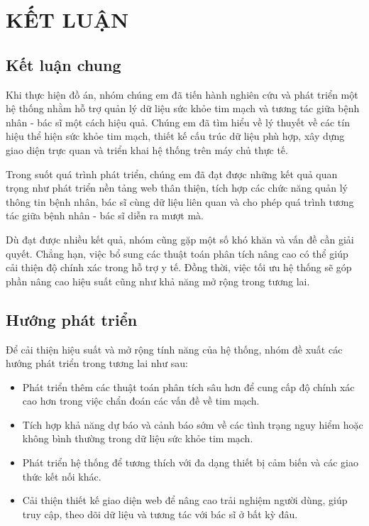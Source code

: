 
\section*{KẾT LUẬN}
\subsection*{Kết luận chung}

Khi thực hiện đồ án, nhóm chúng em đã tiến hành nghiên cứu và phát triển một hệ thống nhằm hỗ trợ quản lý dữ liệu sức khỏe tim mạch và tương tác giữa bệnh nhân - bác sĩ một cách hiệu quả.
Chúng em đã tìm hiểu về lý thuyết về các tín hiệu thể hiện sức khỏe tim mạch, thiết kế cấu trúc dữ liệu phù hợp, xây dựng giao diện trực quan và triển khai hệ thống trên máy chủ thực tế.  

Trong suốt quá trình phát triển, chúng em đã đạt được những kết quả quan trọng như phát triển nền tảng web thân thiện, tích hợp các chức năng quản lý thông tin bệnh nhân, bác sĩ cùng dữ liệu liên quan và cho phép quá trình tương tác giữa bệnh nhân - bác sĩ diễn ra mượt mà.

Dù đạt được nhiều kết quả, nhóm cũng gặp một số khó khăn và vấn đề cần giải quyết. Chẳng hạn, việc bổ sung các thuật toán phân tích nâng cao có thể giúp cải thiện độ chính xác trong hỗ trợ y tế. Đồng thời, việc tối ưu hệ thống sẽ góp phần nâng cao hiệu suất cũng như khả năng mở rộng trong tương lai.
\subsection*{Hướng phát triển}


Để cải thiện hiệu suất và mở rộng tính năng của hệ thống, nhóm đề xuất các hướng phát triển trong tương lai như sau:

\begin{adjustwidth}{1.5em}{}
	\begin{itemize}
		\item Phát triển thêm các thuật toán phân tích sâu hơn để cung cấp độ chính xác cao hơn trong việc chẩn đoán các vấn đề về tim mạch.


		\item Tích hợp khả năng dự báo và cảnh báo sớm về các tình trạng nguy hiểm hoặc không bình thường trong dữ liệu sức khỏe tim mạch.


		\item Phát triển hệ thống để tương thích với đa dạng thiết bị cảm biến và các giao thức kết nối khác.


		\item Cải thiện thiết kế giao diện web để nâng cao trải nghiệm người dùng, giúp truy cập, theo dõi dữ liệu và tương tác với bác sĩ ở bất kỳ đâu.

	\end{itemize}
\end{adjustwidth}


